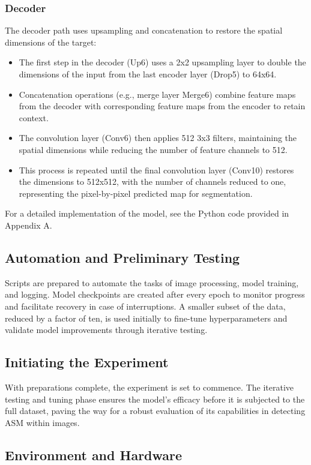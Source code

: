 \documentclass[12pt,a4paper]{article}
\begin{document}
\subsubsection{Decoder}
The decoder path uses upsampling and concatenation to restore the spatial dimensions of the target:
\begin{itemize}
    \item The first step in the decoder (Up6) uses a 2x2 upsampling layer to double the dimensions of the input from the last encoder layer (Drop5) to 64x64.
    \item Concatenation operations (e.g., merge layer Merge6) combine feature maps from the decoder with corresponding feature maps from the encoder to retain context.
    \item The convolution layer (Conv6) then applies 512 3x3 filters, maintaining the spatial dimensions while reducing the number of feature channels to 512.
    \item This process is repeated until the final convolution layer (Conv10) restores the dimensions to 512x512, with the number of channels reduced to one, representing the pixel-by-pixel predicted map for segmentation.
\end{itemize}

For a detailed implementation of the model, see the Python code provided in Appendix A.

\subsection{Automation and Preliminary Testing}
Scripts are prepared to automate the tasks of image processing, model training, and logging. Model checkpoints are created after every epoch to monitor progress and facilitate recovery in case of interruptions. A smaller subset of the data, reduced by a factor of ten, is used initially to fine-tune hyperparameters and validate model improvements through iterative testing.

\subsection{Initiating the Experiment}
With preparations complete, the experiment is set to commence. The iterative testing and tuning phase ensures the model's efficacy before it is subjected to the full dataset, paving the way for a robust evaluation of its capabilities in detecting ASM within images.

\subsection{Environment and Hardware}
\end{document}
